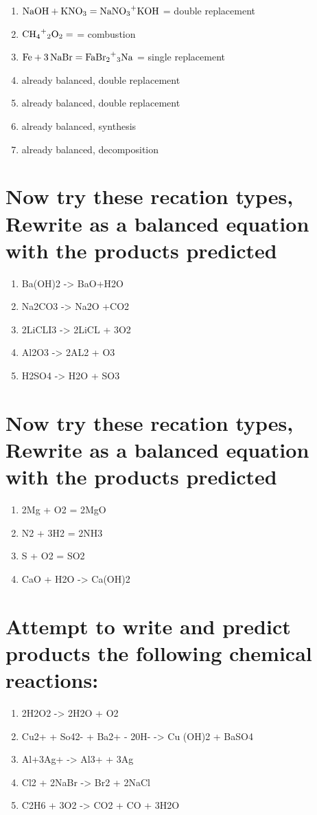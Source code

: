 \documentclass{scrartcl}
\begin{document}
\begin{enumerate}
\item \(\ce{NaOH + KNO3}=\ce{NaNO3+KOH}\) = double replacement
\item \(\ce{CH4+2O2}=\ce{}\) = combustion
\item \(\ce{Fe + 3NaBr}=\ce{FaBr2+3Na}\) = single replacement
\item already balanced, double replacement
\item already balanced, double replacement
\item already balanced, synthesis
\item already balanced, decomposition
\end{enumerate}

\section{Now try these recation types, Rewrite as a balanced equation with the products predicted}
\label{sec:org9979cde}
\begin{enumerate}
\item Ba(OH)2 -> BaO+H2O
\item Na2CO3 -> Na2O +CO2
\item 2LiCLI3 -> 2LiCL + 3O2
\item Al2O3 -> 2AL2 + O3
\item H2SO4 -> H2O + SO3
\end{enumerate}

\section{Now try these recation types, Rewrite as a balanced equation with the products predicted}
\label{sec:org6c58713}

\begin{enumerate}
\item 2Mg + O2 = 2MgO
\item N2 + 3H2 = 2NH3
\item S + O2 = SO2
\item CaO + H2O -> Ca(OH)2
\end{enumerate}

\section{Attempt to write and predict products the following chemical reactions:}
\label{sec:org2a1d301}
\begin{enumerate}
\item 2H2O2 -> 2H2O + O2
\item Cu2+ + So42- + Ba2+ - 20H- -> Cu (OH)2 + BaSO4
\item Al+3Ag+ -> Al3+ + 3Ag
\item Cl2 + 2NaBr -> Br2 + 2NaCl
\item C2H6 + 3O2 -> CO2 + CO + 3H2O
\end{enumerate}
\end{document}
